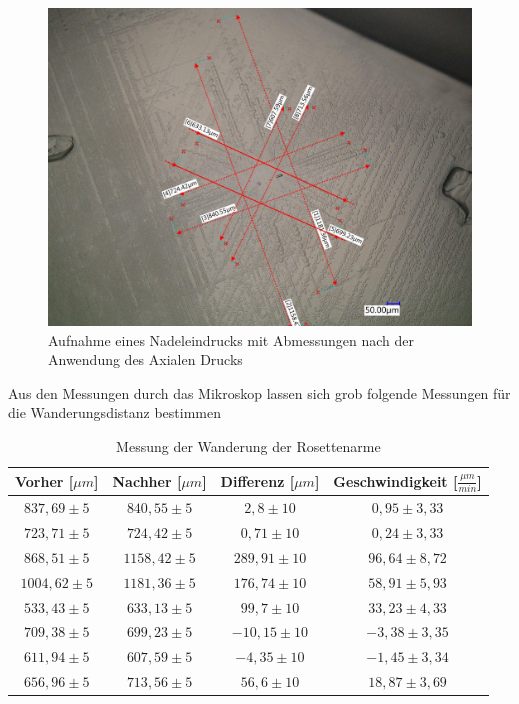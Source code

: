             \begin{figure}[H]
                \centering
                \includegraphics[width=\linewidth]{Images/eriks rosette 1PD Messung.jpg}
                \caption{Aufnahme eines Nadeleindrucks mit Abmessungen nach der Anwendung des Axialen Drucks}
            \end{figure}
            Aus den Messungen durch das Mikroskop lassen sich grob folgende Messungen für die Wanderungsdistanz bestimmen
            \begin{table}[H]
                \centering
                \begin{tabular}[]{c|c|c|c}
                    Vorher [$\mu m$] & Nachher [$\mu m$] & Differenz [$\mu m$] & Geschwindigkeit [$\frac{\mu m}{min}$] \\
                    \hline
                    $837,69 \pm 5$  & $840,55 \pm 5$    & $ 2,8 \pm 10$     & $0,95 \pm 3,33$ \\
                    $723,71 \pm 5$  & $724,42 \pm 5$    & $ 0,71 \pm 10$    & $0,24 \pm 3,33$ \\
                    $868,51 \pm 5$  & $1158,42 \pm 5$   & $ 289,91 \pm 10$  & $96,64 \pm 8,72$\\
                    $1004,62 \pm 5$ & $1181,36 \pm 5$   & $ 176,74 \pm 10$  & $58,91 \pm 5,93$\\
                    $533,43 \pm 5$  & $633,13 \pm 5$    & $ 99,7 \pm 10$    & $33,23 \pm 4,33$\\
                    $709,38 \pm 5$  & $699,23 \pm 5$    & $ -10,15 \pm 10$  & $-3,38 \pm 3,35$\\
                    $611,94 \pm 5$  & $607,59 \pm 5$    & $ -4,35 \pm 10$   & $-1,45 \pm 3,34$\\
                    $656,96  \pm 5$ & $713,56  \pm 5$   & $ 56,6 \pm 10$    & $18,87 \pm 3,69$\\
                \end{tabular}
                \caption{Messung der Wanderung der Rosettenarme}
            \end{table}
